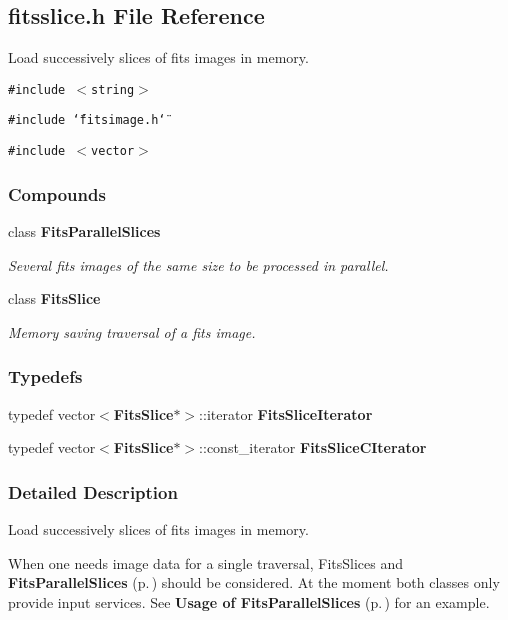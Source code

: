 \subsection{fitsslice.h File Reference}
\label{fitsslice_h}
Load successively slices of fits images in memory. 


{\tt \#include $<$string$>$}\par
{\tt \#include \char`\"{}fitsimage.h\char`\"{}}\par
{\tt \#include $<$vector$>$}\par
\subsubsection*{Compounds}
\begin{CompactItemize}
\item 
class {\bf Fits\-Parallel\-Slices}
\begin{CompactList}\small\item\em Several fits images of the same size to be processed in parallel.\item\end{CompactList}\item 
class {\bf Fits\-Slice}
\begin{CompactList}\small\item\em Memory saving traversal of a fits image.\item\end{CompactList}\end{CompactItemize}
\subsubsection*{Typedefs}
\begin{CompactItemize}
\item 
{}
typedef vector$<${\bf Fits\-Slice}$\ast$$>$::iterator {\bf Fits\-Slice\-Iterator}\label{fitsslice_h_a0}

\item 
{}
typedef vector$<${\bf Fits\-Slice}$\ast$$>$::const\_\-iterator {\bf Fits\-Slice\-CIterator}\label{fitsslice_h_a1}

\end{CompactItemize}


\subsubsection{Detailed Description}
Load successively slices of fits images in memory.

 When one needs image data for a single traversal, Fits\-Slices and {\bf Fits\-Parallel\-Slices} {\rm (p.\,\pageref{class_fitsparallelslices})} should be considered. At the moment both classes only provide input services. See {\bf Usage of Fits\-Parallel\-Slices} {\rm (p.\,\pageref{example_slices})} for an example.

